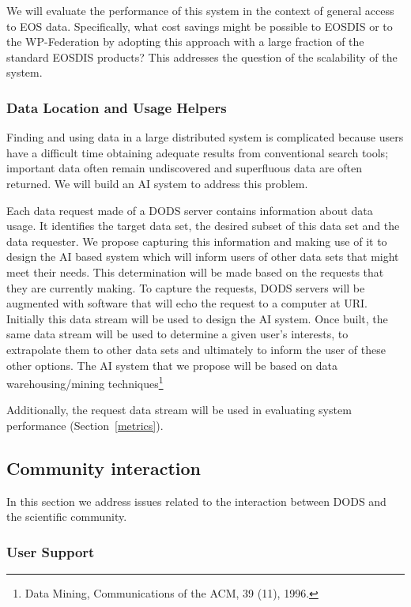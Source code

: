 \documentclass[12pt]{article}
\begin{document}
We will evaluate the performance of this system in the context of
general access to \acs{EOS} data. Specifically, what cost savings
might be possible to \acs{EOSDIS} or to the WP-Federation by adopting
this approach with a large fraction of the standard \acs{EOSDIS}
products? This addresses the question of the scalability of the
system.

\subsubsection{Data Location and Usage Helpers}\label{helpers}

Finding and using data in a large distributed system is complicated 
because users have a difficult time obtaining adequate results from
conventional search tools; important data often remain undiscovered 
and superfluous data are often returned. We will build an \ac{AI} 
system to address this problem.

Each data request made of a \ac{DODS} server contains 
information about data usage. It identifies the target data set, 
the desired subset of this data set and the data requester. We 
propose capturing this information and making use of it to design 
the \ac{AI} based system which will inform users of other data sets 
that might meet their needs. This determination will be made based on 
the requests that they are currently making. To capture the requests, 
\ac{DODS} servers will be augmented with software that will echo 
the request to a computer at \ac{URI}. Initially this data stream 
will be used to design the \ac{AI} system. Once built, the same 
data stream will be used to determine a given user's interests, to 
extrapolate them to other data sets and ultimately to inform the 
user of these other options. The \ac{AI} system that we propose will 
be based on data warehousing/mining techniques\footnote{Data Mining,
Communications of the ACM, 39 (11), 1996.}

Additionally, the request data stream will be used in evaluating
system performance (Section~\ref{metrics}).

\subsection{Community interaction}\label{community-interaction}

In this section we address issues related to the interaction between 
\ac{DODS} and the scientific community.

\subsubsection{User Support}\label{user-support}
\end{document}
